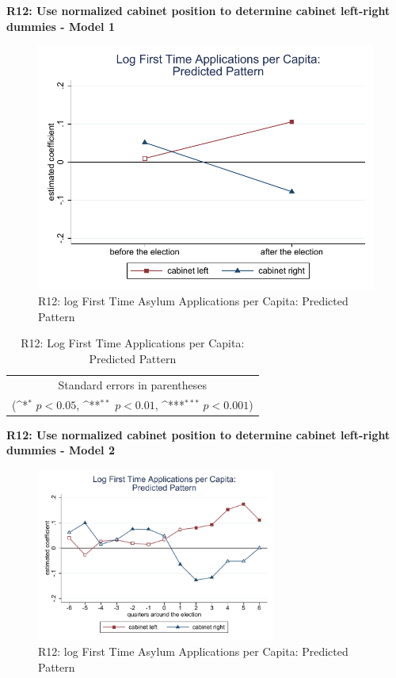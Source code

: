 \documentclass[10pt,a4paper]{scrartcl}
\begin{document}
\clearpage
\textbf{R12: Use normalized cabinet position to determine cabinet left-right dummies - Model 1}
\begin{figure}[!ht]
	\centering
	\includegraphics[width=1\textwidth]{figures_edited/app_graph1_R12.pdf}
	\caption{R12: log First Time Asylum Applications per Capita: Predicted Pattern}
\end{figure}

\begin{table}[!ht]\centering
	\renewcommand{\arraystretch}{1.25}
	\def\sym#1{\ifmmode^{#1}\else\(^{#1}\)\fi}
	\caption{R12: Log First Time Applications per Capita: Predicted Pattern}
	\begin{tabular}{l*{2}{c}}
		\hline\hline
		
		\hline\hline
		\multicolumn{3}{c}{\footnotesize Standard errors in parentheses} \\
		\multicolumn{3}{c}{\footnotesize (\sym{*} \(p<0.05\), \sym{**} \(p<0.01\), \sym{***} \(p<0.001\))}\\
	\end{tabular}
\end{table}

\clearpage
\textbf{R12: Use normalized cabinet position to determine cabinet left-right dummies - Model 2}
\begin{figure}[!ht]
	\centering
	\includegraphics[width=0.7\textwidth]{figures_edited/app_graph2_R12.pdf}
	\caption{R12: log First Time Asylum Applications per Capita: Predicted Pattern}
\end{figure}
\end{document}
